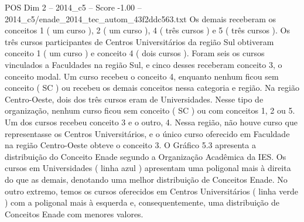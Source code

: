 \begin{textsample}{POS Dim 2 – 2014\_c5 – Score -1.00 – 2014\_c5/enade\_2014\_tec\_autom\_43f2ddc563.txt}
Os demais receberam os conceitos 1 ( um curso ), 2 ( um curso ), 4 ( três cursos ) e 5 ( três cursos ).
Os três cursos participantes de Centros Universitários da região Sul obtiveram conceito 1 ( um curso ) e conceito 4 ( dois cursos ).
Foram seis os cursos vinculados a Faculdades na região Sul, e cinco desses receberam conceito 3, o conceito modal.
Um curso recebeu o conceito 4, enquanto nenhum ficou sem conceito ( SC ) ou recebeu os demais conceitos nessa categoria e região.
Na região Centro-Oeste, dois dos três cursos eram de Universidades.
Nesse tipo de organização, nenhum curso ficou sem conceito ( SC ) ou com conceitos 1, 2 ou 5.
Um dos cursos recebeu conceito 3 e o outro, 4.
Nessa região, não houve curso que representasse os Centros Universitários, e o único curso oferecido em Faculdade na região Centro-Oeste obteve o conceito 3.
O Gráfico 5.3 apresenta a distribuição do Conceito Enade segundo a Organização Acadêmica da IES.
Os cursos em Universidades ( linha azul ) apresentam uma poligonal mais à direita do que as demais, denotando uma melhor distribuição de Conceitos Enade.
No outro extremo, temos os cursos oferecidos em Centros Universitários ( linha verde ) com a poligonal mais à esquerda e, consequentemente, uma distribuição de Conceitos Enade com menores valores.

\end{textsample}
